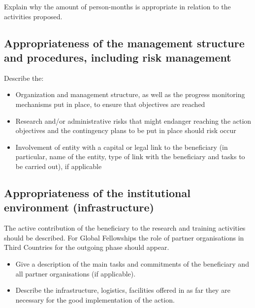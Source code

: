 \medskip\noindent
Explain why the amount of person-months is appropriate in relation to the activities proposed.





\subsection{Appropriateness of the management structure and procedures, including risk management}
\label{sec:implementation_management}

Describe the: 

\begin{itemize}
  \item Organization and management structure, as well as the progress monitoring mechanisms put in place, to ensure that objectives are reached
  \item Research and/or administrative risks that might endanger reaching the action objectives and the contingency plans to be put in place should risk occur  
  \item  Involvement of entity with a capital or legal link to the beneficiary (in particular, name of the entity, type of link with the beneficiary and tasks to be carried out), if applicable
\end{itemize}





\subsection{Appropriateness of the institutional environment (infrastructure)}
\label{sec:implementation_infrastructure}

The active contribution of the beneficiary to the research and training activities should be described. 
For Global Fellowships the role of partner organisations in Third Countries for the outgoing phase should appear. 

\begin{itemize}
  \item Give a description of the main tasks and commitments of the beneficiary and all partner organisations (if applicable).
  \item Describe the infrastructure, logistics, facilities offered in as far they are necessary for the good implementation of the action.
\end{itemize}





\markEndPageLimit

